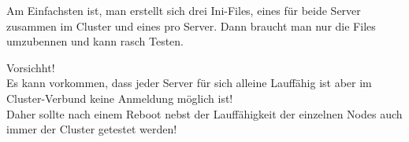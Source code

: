 \begin{flushleft}
    Am Einfachsten ist, man erstellt sich drei Ini-Files, eines für beide Server zusammen im Cluster und eines pro Server.
    Dann braucht man nur die Files umzubennen und kann rasch Testen.
\end{flushleft}
\begin{flushleft}
    \begin{mdframed}
    Vorsichht!\\Es kann vorkommen, dass jeder Server für sich alleine Lauffähig ist aber im Cluster-Verbund keine Anmeldung möglich ist!\\
    Daher sollte nach einem Reboot nebst der Lauffähigkeit der einzelnen Nodes auch immer der Cluster getestet werden!
    \end{mdframed}
\end{flushleft}
